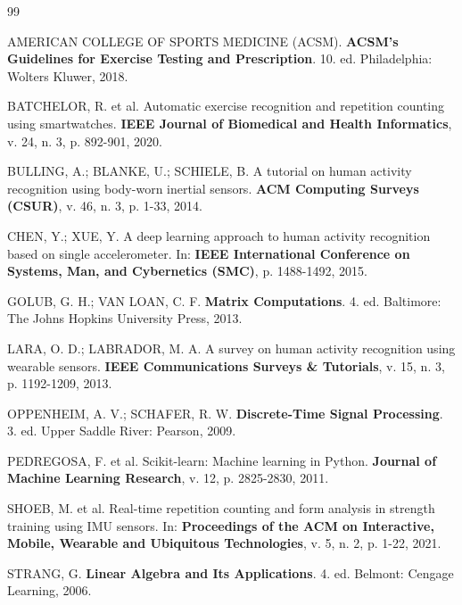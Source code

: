 \documentclass[12pt,openany,oneside,a4paper,english,brazil]{abntex2}
\begin{document}
\postextual

\begin{thebibliography}{99}

AMERICAN COLLEGE OF SPORTS MEDICINE (ACSM). \textbf{ACSM's Guidelines for Exercise Testing and Prescription}. 10. ed. Philadelphia: Wolters Kluwer, 2018.

BATCHELOR, R. et al. Automatic exercise recognition and repetition counting using smartwatches. \textbf{IEEE Journal of Biomedical and Health Informatics}, v. 24, n. 3, p. 892-901, 2020.

BULLING, A.; BLANKE, U.; SCHIELE, B. A tutorial on human activity recognition using body-worn inertial sensors. \textbf{ACM Computing Surveys (CSUR)}, v. 46, n. 3, p. 1-33, 2014.

CHEN, Y.; XUE, Y. A deep learning approach to human activity recognition based on single accelerometer. In: \textbf{IEEE International Conference on Systems, Man, and Cybernetics (SMC)}, p. 1488-1492, 2015.

GOLUB, G. H.; VAN LOAN, C. F. \textbf{Matrix Computations}. 4. ed. Baltimore: The Johns Hopkins University Press, 2013.

LARA, O. D.; LABRADOR, M. A. A survey on human activity recognition using wearable sensors. \textbf{IEEE Communications Surveys \& Tutorials}, v. 15, n. 3, p. 1192-1209, 2013.

OPPENHEIM, A. V.; SCHAFER, R. W. \textbf{Discrete-Time Signal Processing}. 3. ed. Upper Saddle River: Pearson, 2009.

PEDREGOSA, F. et al. Scikit-learn: Machine learning in Python. \textbf{Journal of Machine Learning Research}, v. 12, p. 2825-2830, 2011.

SHOEB, M. et al. Real-time repetition counting and form analysis in strength training using IMU sensors. In: \textbf{Proceedings of the ACM on Interactive, Mobile, Wearable and Ubiquitous Technologies}, v. 5, n. 2, p. 1-22, 2021.

STRANG, G. \textbf{Linear Algebra and Its Applications}. 4. ed. Belmont: Cengage Learning, 2006.

\end{thebibliography}
\end{document}
